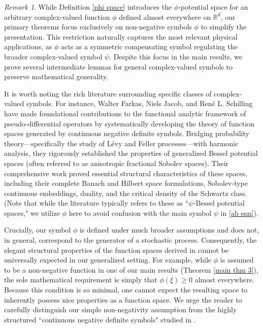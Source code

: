 \documentclass[11pt,reqno]{amsart}
\theoremstyle{definition}
\theoremstyle{remark}
\newtheorem{rem}[thm]{Remark}
\numberwithin{equation}{section}
\begin{document}
\begin{rem}
While Definition \ref{phi space} introduces the $\phi$-potential space for an arbitrary complex-valued function $\phi$ defined almost everywhere on $\mathbb{R}^d$, our primary theorems focus exclusively on non-negative symbols $\phi$ to simplify the presentation. 
This restriction naturally captures the most relevant physical applications, as $\phi$ acts as a symmetric compensating symbol regulating the broader complex-valued symbol $\psi$. 
Despite this focus in the main results, we prove several intermediate lemmas for general complex-valued symbols to preserve mathematical generality.


It is worth noting the rich literature surrounding specific classes of complex-valued symbols. 
For instance, Walter Farkas, Niels Jacob, and René L. Schilling \cite{J1, FJS1} have made foundational contributions to the functional analytic framework of pseudo-differential operators by systematically developing the theory of function spaces generated by continuous negative definite symbols. Bridging probability theory—specifically the study of Lévy and Feller processes—with harmonic analysis, they rigorously established the properties of generalized Bessel potential spaces (often referred to as anisotropic fractional Sobolev spaces). 
Their comprehensive work proved essential structural characteristics of these spaces, including their complete Banach and Hilbert space formulations, Sobolev-type continuous embeddings, duality, and the critical density of the Schwartz class. (Note that while the literature typically refers to these as ``$\psi$-Bessel potential spaces," we utilize $\phi$ here to avoid confusion with the main symbol $\psi$ in \eqref{ab eqn}).


Crucially, our symbol $\phi$ is defined under much broader assumptions and does not, in general, correspond to the generator of a stochastic process. 
Consequently, the elegant structural properties of the function spaces derived in \cite{J1, FJS1} cannot be universally expected in our generalized setting. 
For example, while $\phi$ is assumed to be a non-negative function in one of our main results (Theorem \ref{main thm 3}), the sole mathematical requirement is simply that $\phi(\xi) \ge 0$ almost everywhere. 
Because this condition is so minimal, one cannot expect the resulting space to inherently possess nice properties as a function space. 
We urge the reader to carefully distinguish our simple non-negativity assumption from the highly structured ``continuous negative definite symbols" studied in \cite{J1, FJS1}.
\end{rem}
\end{document}
